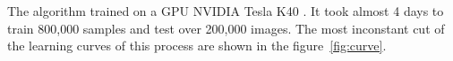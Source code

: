 
\noindent The algorithm trained on a GPU NVIDIA \cite{kirk2007nvidia} Tesla K40 \cite{lindholm2008nvidia}. It took almost 4 days to train 800,000 samples and test over 200,000 images. The most inconstant cut of the learning curves of this process are shown in the figure~\ref{fig:curve}.

